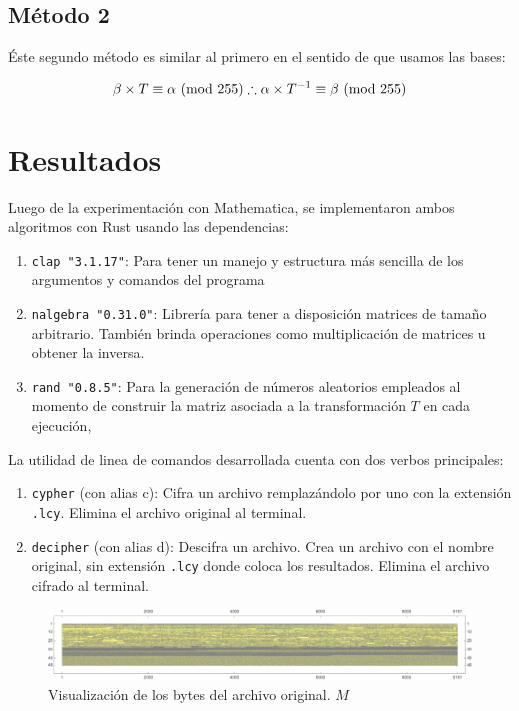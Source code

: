 \documentclass[a4paper]{article}
\begin{document}
\subsection{Método 2}

Éste segundo método es similar al primero en el sentido de que usamos las bases:


\[
\beta \times T \equiv \alpha \text{ (mod 255)}\\
\therefore \alpha \times T^{-1} \equiv \beta \text{ (mod 255)}
\]

\newpage
\section{Resultados}

Luego de la experimentación con Mathematica, se implementaron ambos algoritmos con Rust usando las dependencias:

\begin{enumerate}
    \item \texttt{clap "3.1.17"}: Para tener un manejo y estructura más sencilla de los argumentos y comandos del programa
    \item \texttt{nalgebra "0.31.0"}: Librería para tener a disposición matrices de tamaño arbitrario. También brinda operaciones como multiplicación de matrices u obtener la inversa.
    \item \texttt{rand "0.8.5"}: Para la generación de números aleatorios empleados al momento de construir la matriz asociada a la transformación $T$ en cada ejecución,
\end{enumerate}

La utilidad de linea de comandos desarrollada cuenta con dos verbos principales:

\begin{enumerate}
    \item \texttt{cypher} (con alias c): Cifra un archivo remplazándolo por uno con la extensión \texttt{.lcy}. Elimina el archivo original al terminal.
    \item \texttt{decipher} (con alias d): Descifra un archivo. Crea un archivo con el nombre original, sin extensión \texttt{.lcy} donde coloca los resultados. Elimina el archivo cifrado al terminal.
\end{enumerate}

\begin{figure}[H]
    \centering
    \includegraphics[width=\textwidth]{gr3d}
    \caption{Visualización de los bytes del archivo
original. $M$}
    \label{fig:DatosOrigM1}
\end{figure}
\end{document}
